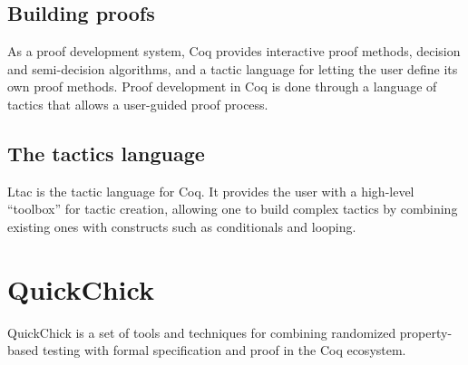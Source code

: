 \subsection{Building proofs}

As a proof development system, Coq provides interactive proof methods, decision and semi-decision algorithms, and a tactic language for letting the user define its own proof methods. Proof development in Coq is done through a language of tactics that allows a user-guided proof process.

\subsection{The tactics language}

Ltac is the tactic language for Coq. It provides the user with a high-level “toolbox” for tactic creation, allowing one to build complex tactics by combining existing ones with constructs such as conditionals and looping.

\section{QuickChick}
\label{section:quickchick}

QuickChick is a set of tools and techniques for combining randomized property-based testing with formal specification and proof in the Coq ecosystem.